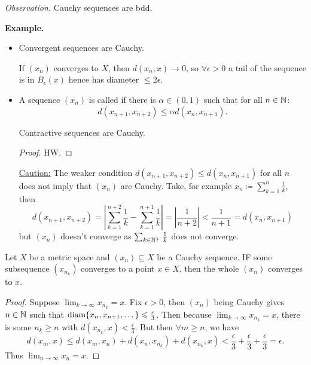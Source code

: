 \documentclass[14pt,oneside]{extarticle}
\newenvironment{example}{
    \par
    \vspace{5pt}
    \noindent\textbf{Example.}
    \begin{tcolorbox}[
        blanker, breakable, left=5mm, parbox=false,
        before upper={\parindent15pt},
        after skip=10pt,
        borderline west={1mm}{0pt}{solarized-magenta!50}]
}{
    \end{tcolorbox}
    \vspace{5pt}
}
\begin{document}
\textit{Observation.} Cauchy sequences are bdd.

\begin{example}
  \begin{itemize}[label=$\circ$, leftmargin=*, itemsep=1em]
    \item Convergent sequences are Cauchy.
    
    \noindent\soln If $(x_n)$ converges to $X$, then $d(x_n,x) \to 0$, so $\forall \epsilon > 0$ a tail of the sequence is in $B_\epsilon(x)$ hence has diameter $\leq 2 \epsilon$.

    \item A sequence $(x_n)$ is called  if there is $\alpha \in (0,1)$ such that for all $n \in \mathbb{N}$:
    \[d(x_{n+1}, x_{n+2}) \leq \alpha d(x_n, x_{n+1}).\]
    \begin{proposition*}
      Contractive sequences are Cauchy.
    \end{proposition*}
    \begin{proof}
      HW.
    \end{proof}
    \underline{Caution:} The weaker condition $d(x_{n+1}, x_{n+2}) \leq d(x_n, x_{n+1})$ for all $n$ does not imply that $(x_n)$ are Cauchy. Take, for example $x_n \coloneqq \sum_{k=1}^{n}\frac{1}{k}$, then 
    \[d(x_{n+1}, x_{n+2}) = \left|\sum_{k=1}^{n+2} \frac 1 k - \sum_{k=1}^{n+1}\frac 1 k\right| = \left|\frac{1}{n+2}\right| < \frac{1}{n+1} = d(x_n, x_{n+1})\]
    but $(x_n)$ doesn't converge as $\sum_{k \in \mathbb{N}^+} \frac{1}{k}$ does not converge.
  \end{itemize}
\end{example}

\begin{proposition*}
  Let $X$ be a metric space and $(x_n) \subseteq X$ be a Cauchy sequence. IF some subsequence $(x_{n_k})$ converges to a point $x \in X$, then the whole $(x_n)$ converges to $x$.
\end{proposition*}
\begin{proof}
  Suppose $\lim_{k \to \infty} x_{n_k} = x$. Fix $\epsilon>0$, then $(x_n)$ being Cauchy gives $n \in \mathbb{N}$ such that $\text{diam}{\{x_n, x_{n+1}, \dots\}} \leqslant \frac{\varepsilon}{3}$. Then because $\lim_{k \to \infty}x_{n_k} = x$, there is some $n_k \geq n$ with $d(x_{n_k},x) < \frac{\epsilon}{3}$. But then $\forall m \geq n$, we have 
  \[d(x_m,x) \leq d(x_m, x_n) + d(x_n, x_{n_k}) + d(x_{n_k}, x) < \frac{\epsilon}{3} + \frac{\epsilon}{3} + \frac{\epsilon}{3} = \epsilon.\]
  Thus $\lim_{n \to \infty} x_n = x$.
\end{proof}
\end{document}
